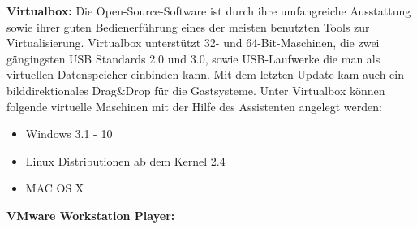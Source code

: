 \textbf{Virtualbox:} Die Open-Source-Software ist durch ihre umfangreiche Ausstattung sowie ihrer 
guten Bedienerführung eines der meisten benutzten Tools zur Virtualisierung. Virtualbox unterstützt 32- 
und 64-Bit-Maschinen, die zwei gängingsten USB Standards 2.0 und 3.0, sowie USB-Laufwerke die man als 
virtuellen Datenspeicher einbinden kann. Mit dem letzten Update kam auch ein bilddirektionales Drag&Drop 
für die Gastsysteme. Unter Virtualbox können folgende virtuelle Maschinen mit der Hilfe des Assistenten 
angelegt werden:
\begin{itemize}
        \item Windows 3.1 - 10
        \item Linux Distributionen ab dem Kernel 2.4
        \item MAC OS X
\end{itemize} 


\textbf{VMware Workstation Player:} 
 
